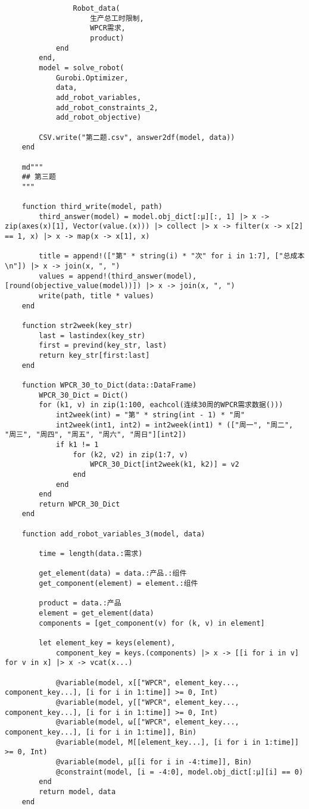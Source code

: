 \begin{appendices}
\begin{lstlisting}
                Robot_data(
                    生产总工时限制,
                    WPCR需求,
                    product)
            end
        end,
        model = solve_robot(
            Gurobi.Optimizer,
            data,
            add_robot_variables,
            add_robot_constraints_2,
            add_robot_objective)

        CSV.write("第二题.csv", answer2df(model, data))
    end

    md"""
    ## 第三题
    """

    function third_write(model, path)
        third_answer(model) = model.obj_dict[:μ][:, 1] |> x -> zip(axes(x)[1], Vector(value.(x))) |> collect |> x -> filter(x -> x[2] == 1, x) |> x -> map(x -> x[1], x)

        title = append!(["第" * string(i) * "次" for i in 1:7], ["总成本\n"]) |> x -> join(x, ", ")
        values = append!(third_answer(model), [round(objective_value(model))]) |> x -> join(x, ", ")
        write(path, title * values)
    end

    function str2week(key_str)
        last = lastindex(key_str)
        first = prevind(key_str, last)
        return key_str[first:last]
    end

    function WPCR_30_to_Dict(data::DataFrame)
        WPCR_30_Dict = Dict()
        for (k1, v) in zip(1:100, eachcol(连续30周的WPCR需求数据()))
            int2week(int) = "第" * string(int - 1) * "周"
            int2week(int1, int2) = int2week(int1) * (["周一", "周二", "周三", "周四", "周五", "周六", "周日"][int2])
            if k1 != 1
                for (k2, v2) in zip(1:7, v)
                    WPCR_30_Dict[int2week(k1, k2)] = v2
                end
            end
        end
        return WPCR_30_Dict
    end

    function add_robot_variables_3(model, data)

        time = length(data.:需求)

        get_element(data) = data.:产品.:组件
        get_component(element) = element.:组件

        product = data.:产品
        element = get_element(data)
        components = [get_component(v) for (k, v) in element]

        let element_key = keys(element),
            component_key = keys.(components) |> x -> [[i for i in v] for v in x] |> x -> vcat(x...)

            @variable(model, x[["WPCR", element_key..., component_key...], [i for i in 1:time]] >= 0, Int)
            @variable(model, y[["WPCR", element_key..., component_key...], [i for i in 1:time]] >= 0, Int)
            @variable(model, ω[["WPCR", element_key..., component_key...], [i for i in 1:time]], Bin)
            @variable(model, M[[element_key...], [i for i in 1:time]] >= 0, Int)
            @variable(model, μ[[i for i in -4:time]], Bin)
            @constraint(model, [i = -4:0], model.obj_dict[:μ][i] == 0)
        end
        return model, data
    end


\end{lstlisting}
\end{appendices}
